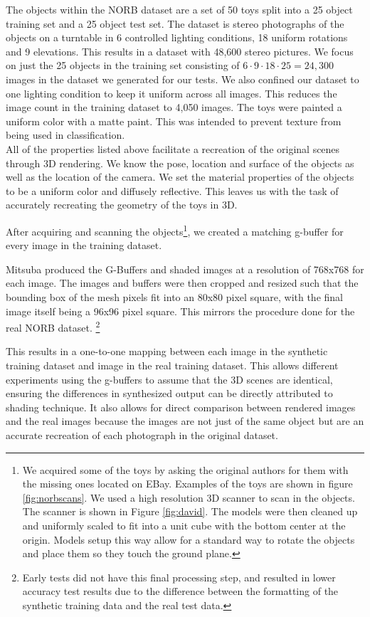 \documentclass[10pt,twocolumn,letterpaper]{article}
\begin{document}
The objects within the NORB dataset are a set of 50 toys split into a 25 object training set and a 25 object test set. The dataset is stereo photographs of the objects on a turntable in 6 controlled lighting conditions, 18 uniform rotations and 9 elevations. This results in a dataset with 48,600 stereo pictures.  We focus on just the 25 objects in the training set consisting of $6\cdot9\cdot18\cdot25=24,300$ images in the dataset we generated for our tests.  We also confined our dataset to one lighting condition to keep it uniform across all images.  This reduces the image count in the training dataset to 4,050 images.   The toys were painted a uniform color with a matte paint. This was intended to prevent texture from being used in classification. \\

All of the properties listed above facilitate a recreation of the original scenes through 3D rendering. We know the pose, location and surface of the objects as well as the location of the camera. We set the material properties of the objects to be a uniform color and diffusely reflective. This leaves us with the task of accurately recreating the geometry of the toys in 3D.

After acquiring and scanning the objects\footnote{We acquired some of the toys by asking the original authors for them with the missing ones located on EBay. Examples of the toys are shown in figure \ref{fig:norbscans}.  We used a high resolution 3D scanner to scan in the objects.  The scanner is shown in Figure \ref{fig:david}.  The models were then cleaned up and uniformly scaled to fit into a unit cube with the bottom center at the origin.  Models setup this way allow for a standard way to rotate the objects and place them so they touch the ground plane.}, we created a matching g-buffer for every image in the training dataset.  

Mitsuba produced the G-Buffers and shaded images at a resolution of 768x768 for each image.  The images and buffers were then cropped and resized such that the bounding box of the mesh pixels fit into an 80x80 pixel square, with the final image itself being a 96x96 pixel square. This mirrors the procedure done for the real NORB dataset.  \footnote{Early tests did not have this final processing step, and resulted in lower accuracy test results due to the difference between the formatting of the synthetic training data and the real test data.}

This results in a one-to-one mapping between each image in the synthetic training dataset and image in the real training dataset.  This allows different experiments using the g-buffers to assume that the 3D scenes are identical, ensuring the differences in synthesized output can be directly attributed to shading technique. 
It also allows for direct comparison between rendered images and the real images because the images are not just of the same object but are an accurate recreation of each photograph in the original dataset.
\end{document}
